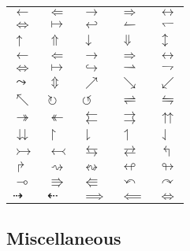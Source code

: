 \documentclass{article}
\begin{document}
\begin{tabular}{lllll}
$\leftarrow $ & $\Leftarrow $ & $\rightarrow $ & $\Rightarrow $ & $%
\leftrightarrow $ \\ 
$\Leftrightarrow $ & $\mapsto $ & $\hookleftarrow $ & $\leftharpoonup $ & $%
\leftharpoondown $ \\ 
$\uparrow $ & $\Uparrow $ & $\downarrow $ & $\Downarrow $ & $\updownarrow $
\\ 
$\longleftarrow $ & $\Longleftarrow $ & $\longrightarrow $ & $%
\Longrightarrow $ & $\longleftrightarrow $ \\ 
$\Longleftrightarrow $ & $\longmapsto $ & $\hookrightarrow $ & $%
\rightharpoonup $ & $\rightharpoondown $ \\ 
$\leadsto $ & $\Updownarrow $ & $\nearrow $ & $\searrow $ & $\swarrow $ \\ 
$\nwarrow $ & $\circlearrowright $ & $\circlearrowleft $ & $%
\rightleftharpoons $ & $\leftrightharpoons $ \\ 
$\twoheadrightarrow $ & $\twoheadleftarrow $ & $\leftleftarrows $ & $%
\rightrightarrows $ & $\upuparrows $ \\ 
$\downdownarrows $ & $\upharpoonright $ & $\downharpoonright $ & $%
\upharpoonleft $ & $\downharpoonleft $ \\ 
$\rightarrowtail $ & $\leftarrowtail $ & $\leftrightarrows $ & $%
\rightleftarrows $ & $\Lsh $ \\ 
$\Rsh $ & $\rightsquigarrow $ & $\leftrightsquigarrow $ & $\looparrowleft $
& $\looparrowright $ \\ 
$\multimap $ & $\Rrightarrow $ & $\Lleftarrow $ & $\curvearrowleft $ & $%
\curvearrowright $ \\ 
$\dashrightarrow $ & $\dashleftarrow $ & $\implies $ & $\impliedby $ & $\iff 
$%
\end{tabular}

\subsection{Miscellaneous}
\end{document}
